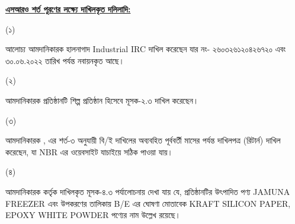 \documentclass[12pt]{article}
\newcommand{\product}{JAMUNA FREEZER}
\newcommand{\good}{KRAFT SILICON PAPER, EPOXY WHITE POWDER}
\newcommand{\ircno}{নং- ২৬০৩২৬১২০৪২৬৭২০}
\newcommand{\ircrenewdt}{৩০.০৬.২০২২}
\newcommand{\musokr}{}
\begin{document}
\begin{minipage}[t]{0.95\linewidth}
\underline{\textbf{এসআরও শর্ত পূরণের লক্ষ্যে
দাখিলকৃত দলিলাদি:}}
\end{minipage}
\footnotesize
\begin{minipage}[t]{0.05\linewidth}
\hspace{0em}
\end{minipage}
\begin{minipage}[t]{0.05\linewidth}
(১)
\end{minipage}
\begin{minipage}[t]{0.90\linewidth}
আলোচ্য আমদানিকারক হালনাগাদ Industrial IRC
দাখিল করেছেন যার {\ircno} এবং
{\ircrenewdt} তারিখ পর্যন্ত নবায়নকৃত আছে।
\end{minipage}
\begin{minipage}[t]{0.05\linewidth}
\hspace{0em}
\end{minipage}
\begin{minipage}[t]{0.05\linewidth}
(২)
\end{minipage}
\begin{minipage}[t]{0.90\linewidth}
আমদানিকারক প্রতিষ্ঠানটি শিল্প প্রতিষ্ঠান হিসেবে
মূসক-২.৩ দাখিল করেছেন।
\end{minipage}
\begin{minipage}[t]{0.05\linewidth}
\hspace{0em}
\end{minipage}
\begin{minipage}[t]{0.05\linewidth}
(৩)
\end{minipage}
\begin{minipage}[t]{0.90\linewidth}
আমদানিকারক {\srooof}, {\srooofd} এর
শর্ত-৩ অনুযায়ী বি/ই দাখিলের অব্যবহিত
পূর্ববর্তী মাসের {\musokr} পর্যন্ত দাখিলপত্র
(রিটার্ন) দাখিল করেছেন, যা NBR এর ওয়েবসাইট
যাচাইয়ে সঠিক পাওয়া যায়।
\end{minipage}
\begin{minipage}[t]{0.05\linewidth}
\hspace{0em}
\end{minipage}
\begin{minipage}[t]{0.05\linewidth}
(৪)
\end{minipage}
\begin{minipage}[t]{0.90\linewidth}
আমদানিকারক কর্তৃক দাখিলকৃত মূসক-৪.৩
পর্যালোচনায় দেখা যায় যে, প্রতিষ্ঠানটির উৎপাদিত
পণ্য {\product} এবং উপকরণের তালিকায়
B/E এর ঘোষণা মোতাবেক {\good} পণ্যের নাম
উল্লেখ রয়েছে।
\\
\end{minipage}
\end{document}
